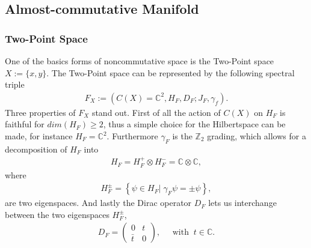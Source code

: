 \subsection{Almost-commutative Manifold\label{sec:5}}
\subsubsection{Two-Point Space}
One of the basics forms of noncommutative space is the Two-Point space $X
:= \{x, y\}$. The Two-Point space can be represented by the following spectral triple
\begin{align}
    F_X := \left(C(X) = \mathbb{C}^2, H_F, D_F; J_F, \gamma _f\right).
\end{align}
Three properties of $F_X$ stand out. First of all the action of $C(X)$ on
$H_F$ is faithful for $dim(H_F) \geq 2$, thus a simple choice for the
Hilbertspace can be made, for instance $H_F = \mathbb{C}^2$. Furthermore
$\gamma_F$ is the $\mathbb{Z}_2$ grading, which allows for a decomposition of
$H_F$ into
\begin{align}
   H_F = H_F^+ \otimes H_F^- = \mathbb{C} \otimes \mathbb{C},
\end{align}
where
\begin{align}
    H_F^\pm = \left\{\psi \in H_F |\; \gamma_F\psi = \pm \psi\right\},
\end{align}
are two eigenspaces. And lastly the Dirac operator $D_F$ lets us
interchange between the two eigenspaces $H_F^\pm$,
\begin{align}
    D_F =
        \begin{pmatrix}0 & t \\ \bar{t} & 0\end{pmatrix},  \;\;\;\;\;
            \text{with} \;\; t\in\mathbb{C}.
\end{align}

